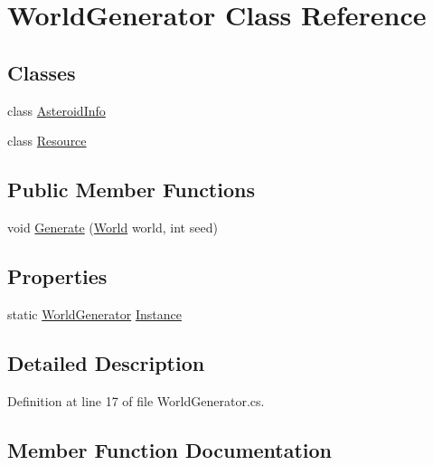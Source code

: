 \hypertarget{class_world_generator}{}\section{World\+Generator Class Reference}
\label{class_world_generator}
\subsection*{Classes}
\begin{DoxyCompactItemize}
\item 
class \hyperlink{class_world_generator_1_1_asteroid_info}{Asteroid\+Info}
\item 
class \hyperlink{class_world_generator_1_1_resource}{Resource}
\end{DoxyCompactItemize}
\subsection*{Public Member Functions}
\begin{DoxyCompactItemize}
\item 
void \hyperlink{class_world_generator_a4566435432aa9c52dcb4d25190077a96}{Generate} (\hyperlink{class_world}{World} world, int seed)
\end{DoxyCompactItemize}
\subsection*{Properties}
\begin{DoxyCompactItemize}
\item 
static \hyperlink{class_world_generator}{World\+Generator} \hyperlink{class_world_generator_a9884276e6346c35ee206f1ce769e074f}{Instance}
\end{DoxyCompactItemize}


\subsection{Detailed Description}


Definition at line 17 of file World\+Generator.\+cs.



\subsection{Member Function Documentation}
\mbox{\label{class_world_generator_a4566435432aa9c52dcb4d25190077a96}} 
